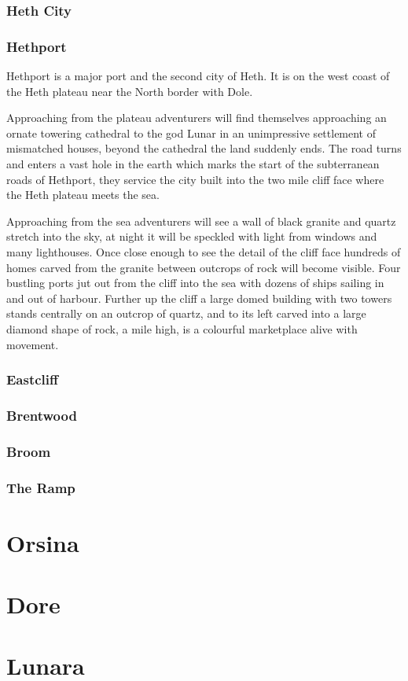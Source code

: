 \documentclass[10pt,twoside,twocolumn,openany,justified,bg=full,nomultitoc]{dndbook}
\begin{document}
\subsection{Heth City}
\label{sec-2-3-1}

\subsection{Hethport}
\label{sec-2-3-2}
Hethport is a major port  and the second city of Heth. It is on the west coast of the Heth plateau near the North border with Dole. 

\begin{commentbox}{}Approaching from the plateau adventurers will find themselves approaching an ornate towering cathedral to the god Lunar in an unimpressive settlement of mismatched houses, beyond the cathedral the land suddenly ends. The road turns and enters a vast hole in the earth which marks the start of the subterranean roads of Hethport, they service the city built into the two mile cliff face where the Heth plateau meets the sea. 

Approaching from the sea adventurers will see a wall of black granite and quartz stretch into the sky, at night it will be speckled with light from windows and many lighthouses. Once close enough to see the detail of the cliff face hundreds of homes carved from the granite between outcrops of rock will become visible. Four bustling ports jut out from the cliff into the sea with dozens of ships sailing in and out of harbour. Further up the cliff a large domed building with two towers stands centrally on an outcrop of quartz, and to its left carved into a large diamond shape of rock, a mile high, is a colourful marketplace alive with movement. 
\end{commentbox}

\subsection{Eastcliff}
\label{sec-2-3-3}
\subsection{Brentwood}
\label{sec-2-3-4}
\subsection{Broom}
\label{sec-2-3-5}
\subsection{The Ramp}
\label{sec-2-3-6}
\chapter{Orsina}
\label{sec-3}

\chapter{Dore}
\label{sec-4}

\chapter{Lunara}
\label{sec-5}
\end{document}
